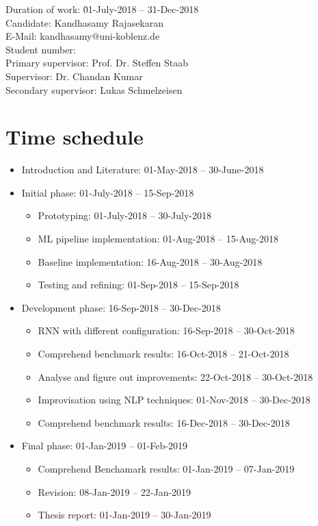 \documentclass[a4paper, 11pt]{article}
\makeatletter
\newcommand{\myName}{Kandhasamy Rajasekaran}
\newcommand{\emailID}{kandhasamy@uni-koblenz.de}
\newcommand{\matriculationID}{216100855}
\newcommand{\StartDate}{01-July-2018}
\newcommand{\EndDate}{31-Dec-2018}
\newcommand{\expert}{Prof. Dr. Steffen Staab}%
\newcommand{\supervisor}{Dr. Chandan Kumar} %
\newcommand{\secondSupervisor}{Lukas Schmelzeisen} %
\makeatother
\begin{document}
\begin{tabbing}
Duration of work: \hspace{1.1cm} \= \StartDate{} -- \EndDate{}\\
\vspace{0.5ex}Candidate:	\> \myName{}\\
\vspace{0.5ex}E-Mail:	\> \emailID{}\\
\vspace{0.5ex}Student number: \> \matriculationID{}\\
\vspace{0.5ex}Primary supervisor: \> \expert{}\\
Supervisor: \> \supervisor{}\\
Secondary supervisor: \> \secondSupervisor{}\\
\end{tabbing}


\section{Time schedule}

\begin{itemize}
	\item Introduction and Literature: 01-May-2018 – 30-June-2018
	\item Initial phase: 01-July-2018 – 15-Sep-2018
	\begin{itemize}
		\item Prototyping: 01-July-2018 – 30-July-2018
		\item ML pipeline implementation: 01-Aug-2018 – 15-Aug-2018
        \item Baseline implementation: 16-Aug-2018 – 30-Aug-2018
        \item Testing and refining: 01-Sep-2018 – 15-Sep-2018
	\end{itemize}
	\item Development phase: 16-Sep-2018 – 30-Dec-2018
	\begin{itemize}
		\item RNN with different configuration: 16-Sep-2018 – 30-Oct-2018
		\item Comprehend benchmark results: 16-Oct-2018 – 21-Oct-2018
		\item Analyse and figure out improvements: 22-Oct-2018 – 30-Oct-2018
        \item Improvisation using NLP techniques: 01-Nov-2018 – 30-Dec-2018
        \item Comprehend benchmark results: 16-Dec-2018 – 30-Dec-2018
	\end{itemize}
	\item Final phase: 01-Jan-2019 – 01-Feb-2019
	\begin{itemize}
	 	\item Comprehend Benchamark results: 01-Jan-2019 – 07-Jan-2019
		\item Revision: 08-Jan-2019 – 22-Jan-2019
		\item Thesis report: 01-Jan-2019 – 30-Jan-2019
	\end{itemize}
\end{itemize}
\end{document}
